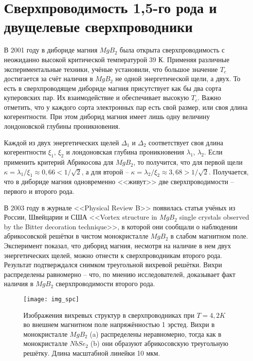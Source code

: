 \section{Сверхпроводимость 1,5-го рода и двущелевые сверхпроводники}

В 2001 году в дибориде магния \( MgB_2 \) была открыта сверхпроводимость с 
неожиданно высокой критической температурой 39 К. Применяя различные 
экспериментальные техники, учёные установили, что большое значение \( T_c \) 
достигается за счёт наличия в \( MgB_2 \) не одной энергетической щели, а 
двух. То есть в сверхпроводящем дибориде магния присутствует как бы два сорта 
куперовских пар. Их взаимодействие и обеспечивает высокую \( T_c \). Важно 
отметить, что у каждого сорта электронных пар есть свой размер, или своя длина 
когерентности. При этом диборид магния имеет лишь одну величину лондоновской 
глубины проникновения. \cite{bib:net}

Каждой из двух энергетических щелей \( \Delta_1 \) и \( \Delta_2 \) 
соответствует своя длина когерентности \( \xi_1 \), \( \xi_2 \) и лондоновская 
глубина проникновения \( \lambda_1 \), \( \lambda_2 \). Если применить 
критерий Абрикосова для \( MgB_2 \), то получится, что для первой щели 
\( \kappa = \lambda_1 / \xi_1 \approx 0,66 < 1/\sqrt{2} \), а для второй -- 
\( \kappa = \lambda_2 / \xi_2 \approx 3,68 > 1/\sqrt{2} \). Получается, что в 
дибориде магния одновременно <<живут>> две сверхпроводимости -- первого и 
второго рода.

В 2003 году в журнале <<Physical Review B>> появилась статья учёных из России, 
Швейцарии и США <<Vortex structure in \( MgB_2 \) single crystals observed by 
the Bitter decoration technique>>, в которой они сообщали о наблюдении 
абрикосовской решётки в чистом монокристалле \( MgB_2 \) в слабом магнитном 
поле. Эксперимент показал, что диборид магния, несмотря на наличие в нем двух 
энергетических щелей, можно отнести к сверхпроводникам второго рода. 
Результат подтверждался снимком треугольной вихревой решётки. Вихри 
распределены равномерно -- что, по мнению исследователей, доказывает факт 
наличия в \( MgB_2 \) сверхпроводимости второго рода.

\begin{figure}[h!]
    \center
    \texttt{[image: img\_spc]}
    \caption{Изображения вихревых структур в сверхпроводниках при 
        \( T = 4,2 K \) во внешнем магнитном поле напряжённостью 1 эрстед.
        Вихри в монокристалле \( MgB_2 \) (a) распределены неравномерно, тогда 
        как в монокристалле \( NbSe_2 \) (b) они образуют абрикосовскую 
        треугольную решётку. Длина масштабной линейки 10 мкм.}
    \label{img:spc}
\end{figure}

